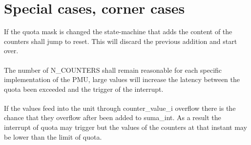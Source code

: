 \section{Special cases, corner cases}

If the quota mask is changed the state-machine that adds the content of the counters shall jump to reset. This will discard the previous addition and start over.\\
\\
The number of N\_COUNTERS shall remain reasonable for each specific implementation of the PMU, large values will increase the latency between the quota been exceeded and the trigger of the interrupt.\\
\\
If the values feed into the unit through counter\_value\_i overflow there is the chance that they overflow after been added to suma\_int. As a result the interrupt of quota may trigger but the values of the counters at that instant may be lower than the limit of quota.
